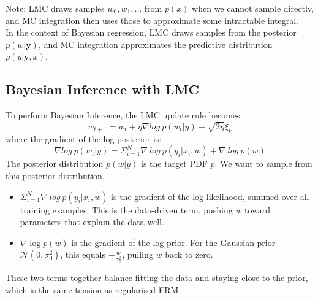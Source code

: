 \documentclass[../Probability.tex]{subfiles}
\begin{document}
Note: LMC draws samples $w_0, w_1, \ldots$ from $p(x)$ when we cannot sample directly, and MC integration then uses those to approximate some intractable integral.\\
In the context of Bayesian regression, LMC draws samples from the posterior $p(w|\mathbf{y})$, and MC integration approximates the predictive distribution $p(y|\mathbf{y},x)$.

\subsection{Bayesian Inference with LMC}
To perform Bayesian Inference, the LMC update rule becomes:
$$w_{t+1}=w_{t}+\eta\nabla log~p(w_{t}|y)+\sqrt{2\eta}\xi_{k}$$
where the gradient of the log posterior is:
$$\nabla log~p(w_{t}|y)=\Sigma_{i=1}^{N}\nabla~log~p(y_{i}|x_{i},w)+\nabla~log~p(w)$$
The posterior distribution $p(w|y)$ is the target PDF $p$. We want to sample from this posterior distribution.\\
\begin{itemize}
    \item $\Sigma_{i=1}^{N}\nabla~log~p(y_{i}|x_{i},w)$ is the gradient of the log likelihood, summed over all training examples.
    This is the data-driven term, pushing $w$ toward parameters that explain the data well.
    \item $\nabla\log p(w)$ is the gradient of the log prior. For the Gaussian prior $\mathcal{N}(0,\sigma_0^2)$, this equals $-\frac{w}{\sigma_0^2}$, pulling $w$ back to zero.
\end{itemize}
These two terms together balance fitting the data and staying close to the prior, which is the same tension as regularised ERM.
\end{document}
